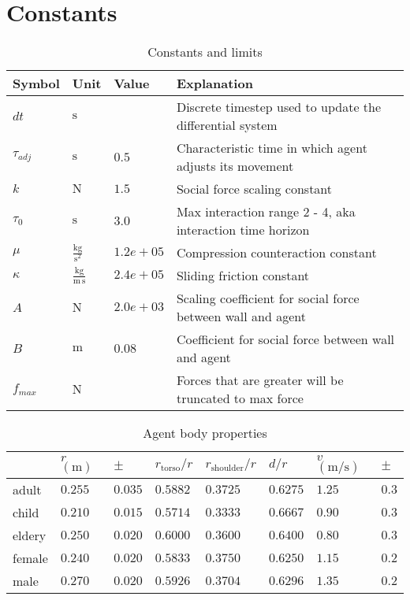 \section{Constants}

\begin{table}[H]
\begin{tabular}{ lll|l }
\hline
Symbol         & Unit & Value & Explanation \\
\hline
\hline
$ dt $ & $ \mathrm{s} $ &  & Discrete timestep used to update the differential system \\
\hline
\hline
$ \tau_{adj} $ & $ \mathrm{s} $ & $ 0.5 $ & Characteristic time in which agent adjusts its movement \\
$ k $          & $ \mathrm{N} $ & $ 1.5 $ & Social force scaling constant \\
$ \tau_{0} $   & $ \mathrm{s} $ & $ 3.0 $ & Max interaction range 2 - 4, aka interaction time horizon \\
$ \mu $        & $ \mathrm{\frac{kg}{s^{2}}} $ & $ 1.2e+05 $ & Compression counteraction constant \\
$ \kappa $     & $ \mathrm{\frac{kg}{m\,s}} $ & $ 2.4e+05 $ & Sliding friction constant \\
$ A $          & $ \mathrm{N} $ & $ 2.0e+03 $ & Scaling coefficient for social force between wall and agent \\
$ B $          & $ \mathrm{m} $ & $ 0.08 $ & Coefficient for social force between wall and agent \\
\hline
\hline
$ f_{max} $    & $ \mathrm{N} $ &  & Forces that are greater will be truncated to max force \\
\hline
\end{tabular} 
\caption{Constants and limits}
\end{table}

\begin{table}[H]
\begin{tabular}{l|lllllll}
& $ r $ $ (\mathrm{m}) $ & $ \pm $ & $ r_{\text{torso}} / r $ & $ r_{\text{shoulder}} / r $ & $ d / r $ & $ v $ $ (\mathrm{m} / \mathrm{s}) $ & $ \pm $ \\
\hline\hline
adult & $ 0.255 $ & $ 0.035 $ & $ 0.5882 $ & $ 0.3725 $ & $ 0.6275 $ & $ 1.25 $ & $ 0.3 $ \\
child & $ 0.210 $ & $ 0.015 $ & $ 0.5714 $ & $ 0.3333 $ & $ 0.6667 $ & $ 0.90 $ & $ 0.3 $ \\
eldery & $ 0.250 $ & $ 0.020 $ & $ 0.6000 $ & $ 0.3600 $ & $ 0.6400 $ & $ 0.80 $ & $ 0.3 $ \\
female & $ 0.240 $ & $ 0.020 $ & $ 0.5833 $ & $ 0.3750 $ & $ 0.6250 $ & $ 1.15 $ & $ 0.2 $ \\
male & $ 0.270 $ & $ 0.020 $ & $ 0.5926 $ & $ 0.3704 $ & $ 0.6296 $ & $ 1.35 $ & $ 0.2 $ \\
\hline
\end{tabular} 
\caption{Agent body properties}
\end{table} 
